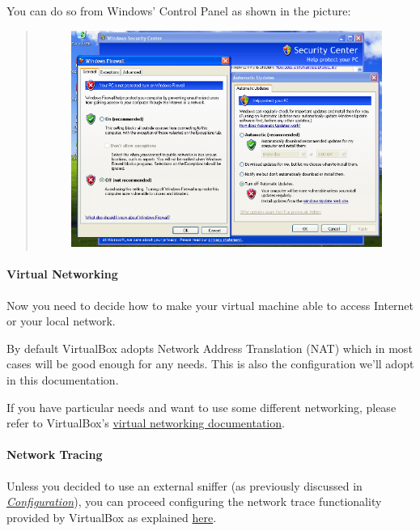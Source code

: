\documentclass[letterpaper,10pt,english]{sphinxmanual}
\begin{document}
You can do so from Windows' Control Panel as shown in the picture:
\begin{quote}
\begin{figure}[htbp]
\centering

\includegraphics{windows_security.png}
\end{figure}
\end{quote}


\paragraph{Virtual Networking}
\label{installation/guest/network:virtual-networking}
Now you need to decide how to make your virtual machine able to access Internet
or your local network.

By default VirtualBox adopts Network Address Translation (NAT) which in most
cases will be good enough for any needs.
This is also the configuration we'll adopt in this documentation.

If you have particular needs and want to use some different networking, please
refer to VirtualBox's \href{https://www.virtualbox.org/manual/ch06.html}{virtual networking documentation}.


\paragraph{Network Tracing}
\label{installation/guest/network:network-tracing}\label{installation/guest/network:virtual-networking-documentation}
Unless you decided to use an external sniffer (as previously discussed in
{\hyperref[installation/host/configuration::doc]{\emph{Configuration}}}), you can proceed configuring the network trace
functionality provided by VirtualBox as explained \href{https://www.virtualbox.org/wiki/Network\_tips}{here}.
\end{document}
